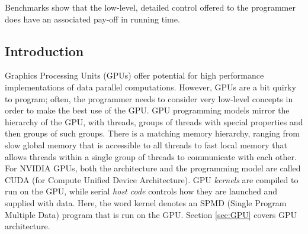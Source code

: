 


Benchmarks show that the low-level, detailed control offered to the 
programmer does have an associated pay-off in running time. 








\subsection{Introduction}

Graphics Processing Units (GPUs) offer potential for high 
performance implementations of data parallel computations. However, 
GPUs are a bit quirky to program; often, the programmer needs to consider 
very low-level concepts in order to make the best use of the GPU. 
GPU programming models mirror the hierarchy of the GPU, with threads, groups of
threads with special properties and then groups of such groups.
There is a matching memory hierarchy, ranging 
from slow global memory that is accessible to all
threads to fast local memory that allows threads within a single
group of threads to communicate with each other.
For NVIDIA GPUs, both the architecture and the programming model are called
CUDA (for Compute Unified Device Architecture). GPU \emph{kernels} are compiled
to run
on the GPU, while serial {\em host code} controls
how they are launched and supplied with data. Here, the word 
kernel denotes an SPMD (Single Program Multiple Data) program that is 
run on the GPU. Section \ref{sec:GPU} covers GPU architecture. 


